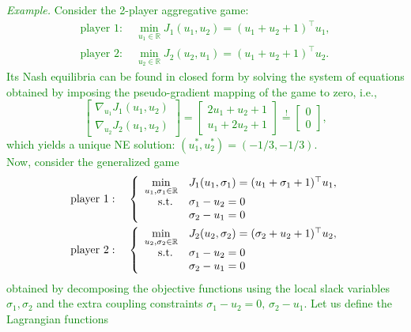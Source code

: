 \documentclass[11pt]{article}
\newcommand{\green}{\textcolor{green}}
\newcommand{\0}{\mathbf{0}}
\newcommand{\1}{\mathbf{1}}
\newcommand{\edit}[1]{\color{blue}{#1 }\color{black} }
\begin{document}
\textit{ \edit{``Nevertheless, none of these works considers both coupled objectives and constraints.''}}

\green{
\textit{Example.} Consider the 2-player aggregative game:
\begin{align*} 
\text{player }1: \quad \min_{u_1 \in \mathbb R}J_1(u_1,u_2) = (u_1+u_2 + 1)^\top u_1,\\
\text{player }2: \quad \min_{u_2 \in \mathbb R} J_2(u_2,u_1) = (u_1+u_2 + 1)^\top u_2.
\end{align*}
Its Nash equilibria can be found in closed form by solving the system of equations obtained by imposing the pseudo-gradient mapping of the game to zero, i.e.,
\begin{equation*}
\left[
\begin{array}{l}
\nabla_{u_1} J_1(u_1,u_2)\\
\nabla_{u_2} J_2(u_1,u_2)
\end{array}
\right]
=
\left[
\begin{array}{l}
2u_1+u_2+1\\
u_1+2u_2+1
\end{array}
\right]
\overset{!}{=}
\left[
\begin{array}{l}
0\\
0
\end{array}
\right],
\end{equation*} 
which yields a unique NE solution: $(u_1^*,u_2^*) = (-1/3,-1/3) $.\\
Now, consider the generalized game
\begin{align*} \
\text{player }1: \quad 
\left\{
\begin{array}{r l}
\displaystyle
\min_{u_1,\sigma_1 \in \mathbb R}& J_1(u_1,\sigma_1) = (u_1+\sigma_1 + 1)^\top u_1,\\
\text{s.t. } & \sigma_1 - u_2 = 0\\
            &  \sigma_2 - u_1 = 0
\end{array}
\right.
\\
\text{player }2: \quad 
\left\{
\begin{array}{r l}
\displaystyle
\min_{u_2,\sigma_2 \in \mathbb R}& J_2(u_2,\sigma_2) = (\sigma_2+u_2 + 1)^\top u_2,\\
\text{s.t. } & \sigma_1 - u_2 = 0\\
            &  \sigma_2 - u_1 = 0
\end{array}
\right.
\end{align*} 
obtained by decomposing the objective functions using the local slack variables $\sigma_1,\sigma_2$ and the extra coupling constraints $\sigma_1 - u_2 = 0, \, \sigma_2 - u_1$. Let us define the Lagrangian functions
}
\end{document}
